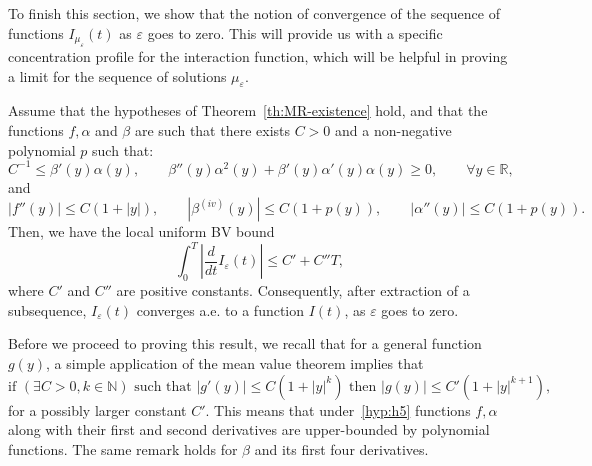 \documentclass[onefignum,onetabnum]{siamart190516}
\newcommand{\R}{\mathbb{R}}
\newcommand{\1}{\mathbbm{1}}
\newcommand{\eps}{\varepsilon}
\begin{document}
To finish this section, we show that the notion of convergence of the sequence of functions $I_{\mu_\eps}(t)$ as $\eps$ goes to zero. This will provide us with a specific concentration profile for the interaction function, which will be helpful in proving a limit for the sequence of solutions $\mu_\eps$.

\begin{lemma}
\label{lem:Jeps}
Assume that the hypotheses of Theorem~\ref{th:MR-existence} hold, and that the functions $f,\alpha$ and $\beta$ are such that there exists $C>0$ and a non-negative polynomial $p$ such that:
\begin{equation}
\label{hyp:h4}
C^{-1}\leq \beta'(y)\alpha(y),\qquad \beta''(y)\alpha^2(y)+\beta'(y)\alpha'(y)\alpha(y)\geq0,\qquad \forall y\in\R,
\end{equation}
and
\begin{equation}
\label{hyp:h5}
|f''(y)|\leq C(1+|y|),\qquad |\beta^{(iv)}(y)|\leq C(1+p(y)),\qquad |\alpha''(y)|\leq C(1+p(y)).
\end{equation}
Then, we have the local uniform BV bound
$$
\int_0^T\left| \frac{d}{dt}I_\eps(t)\right|\leq C'+C''T,
$$
where $C'$ and $C''$ are positive constants. Consequently, after extraction of a subsequence, $I_\eps(t)$ converges a.e. to a function $I(t)$, as $\eps$ goes to zero.
\end{lemma}

Before we proceed to proving this result, we recall that for a general function $g(y)$, a simple application of the mean value theorem implies that
$$
\text{if }(\exists C>0,k\in\mathbb N)\text{ such that }|g'(y)|\leq C(1+|y|^k) \text{ then }|g(y)|\leq C'(1+|y|^{k+1}),
$$
for a possibly larger constant $C'$. This means that under~\eqref{hyp:h5} functions $f,\alpha$ along with their first and second derivatives are upper-bounded by polynomial functions. The same remark holds for $\beta$ and its first four derivatives.
\end{document}
